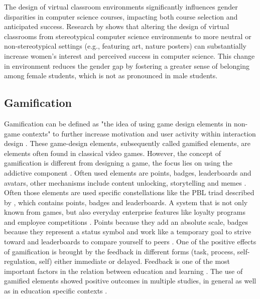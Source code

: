 The design of virtual classroom environments significantly influences gender disparities in computer science courses, impacting both course selection and anticipated success.
Research by \textcite{cheryanClassroomsMatterDesign2011} shows that altering the design of virtual classrooms from stereotypical computer science environments  to more neutral or non-stereotypical settings (e.g., featuring art, nature posters) can substantially increase women's interest and perceived success in computer science.
This change in environment reduces the gender gap by fostering a greater sense of belonging among female students, which is not as pronounced in male students.

\subsection{Gamification}
Gamification can be defined as "the idea of using game design elements in non-game contexts" \>\parencite{deterdingGameDesignElements2011} to further increase motivation and user activity within interaction design \parencite{deterdingGameDesignElements2011}.
These game-design elements, subsequently called gamified elements, are elements often found in classical video games. However, the concept of gamification is different from designing a game, the focus lies on using the addictive component \parencite{gonzalezGamificationIntelligentTutoring2014}. Often used elements are points, badges, leaderboards and avatars, other mechanisms include content unlocking, storytelling and memes \parencite{zainuddinImpactGamificationLearning2020}.
Often those elements are used specific constellations like the PBL triad described by \textcite{werbachWinHowGame2012}, which contains points, badges and leaderboards.
A system that is not only known from games, but also everyday enterprise features like loyalty programs and employee competitions \parencite{werbachWinHowGame2012}.
Points because they add an absolute scale, badges because they represent a status symbol and work like a temporary goal to strive toward and leaderboards to compare yourself to peers \parencite{werbachWinHowGame2012}.
One of the positive effects of gamification is brought by the feedback in different forms (task, process, self-regulation, self) either immediate or delayed.
Feedback is one of the most important factors in the relation between education and learning \textcite{sailerGamificationLearningMetaanalysis2020}.
The use of gamified elements showed positive outcomes in multiple studies, in general \parencite{hamariDoesGamificationWork2014} as well as in education specific contexts \parencite{sailerGamificationLearningMetaanalysis2020}.
